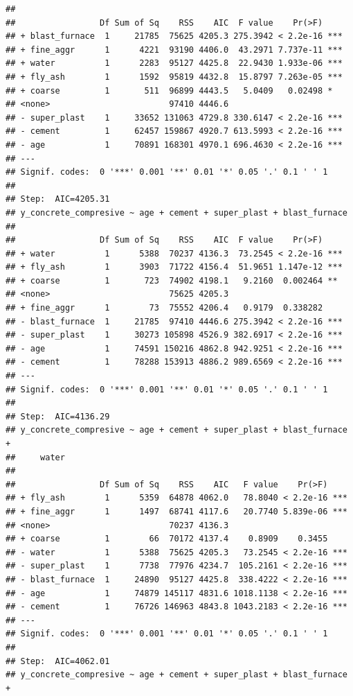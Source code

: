 \documentclass[
  12pt,
]{article}
\begin{document}
\begin{verbatim}
## 
##                 Df Sum of Sq    RSS    AIC  F value    Pr(>F)    
## + blast_furnace  1     21785  75625 4205.3 275.3942 < 2.2e-16 ***
## + fine_aggr      1      4221  93190 4406.0  43.2971 7.737e-11 ***
## + water          1      2283  95127 4425.8  22.9430 1.933e-06 ***
## + fly_ash        1      1592  95819 4432.8  15.8797 7.263e-05 ***
## + coarse         1       511  96899 4443.5   5.0409   0.02498 *  
## <none>                        97410 4446.6                       
## - super_plast    1     33652 131063 4729.8 330.6147 < 2.2e-16 ***
## - cement         1     62457 159867 4920.7 613.5993 < 2.2e-16 ***
## - age            1     70891 168301 4970.1 696.4630 < 2.2e-16 ***
## ---
## Signif. codes:  0 '***' 0.001 '**' 0.01 '*' 0.05 '.' 0.1 ' ' 1
## 
## Step:  AIC=4205.31
## y_concrete_compresive ~ age + cement + super_plast + blast_furnace
## 
##                 Df Sum of Sq    RSS    AIC  F value    Pr(>F)    
## + water          1      5388  70237 4136.3  73.2545 < 2.2e-16 ***
## + fly_ash        1      3903  71722 4156.4  51.9651 1.147e-12 ***
## + coarse         1       723  74902 4198.1   9.2160  0.002464 ** 
## <none>                        75625 4205.3                       
## + fine_aggr      1        73  75552 4206.4   0.9179  0.338282    
## - blast_furnace  1     21785  97410 4446.6 275.3942 < 2.2e-16 ***
## - super_plast    1     30273 105898 4526.9 382.6917 < 2.2e-16 ***
## - age            1     74591 150216 4862.8 942.9251 < 2.2e-16 ***
## - cement         1     78288 153913 4886.2 989.6569 < 2.2e-16 ***
## ---
## Signif. codes:  0 '***' 0.001 '**' 0.01 '*' 0.05 '.' 0.1 ' ' 1
## 
## Step:  AIC=4136.29
## y_concrete_compresive ~ age + cement + super_plast + blast_furnace + 
##     water
## 
##                 Df Sum of Sq    RSS    AIC   F value    Pr(>F)    
## + fly_ash        1      5359  64878 4062.0   78.8040 < 2.2e-16 ***
## + fine_aggr      1      1497  68741 4117.6   20.7740 5.839e-06 ***
## <none>                        70237 4136.3                        
## + coarse         1        66  70172 4137.4    0.8909    0.3455    
## - water          1      5388  75625 4205.3   73.2545 < 2.2e-16 ***
## - super_plast    1      7738  77976 4234.7  105.2161 < 2.2e-16 ***
## - blast_furnace  1     24890  95127 4425.8  338.4222 < 2.2e-16 ***
## - age            1     74879 145117 4831.6 1018.1138 < 2.2e-16 ***
## - cement         1     76726 146963 4843.8 1043.2183 < 2.2e-16 ***
## ---
## Signif. codes:  0 '***' 0.001 '**' 0.01 '*' 0.05 '.' 0.1 ' ' 1
## 
## Step:  AIC=4062.01
## y_concrete_compresive ~ age + cement + super_plast + blast_furnace + 

\end{verbatim}
\end{document}

